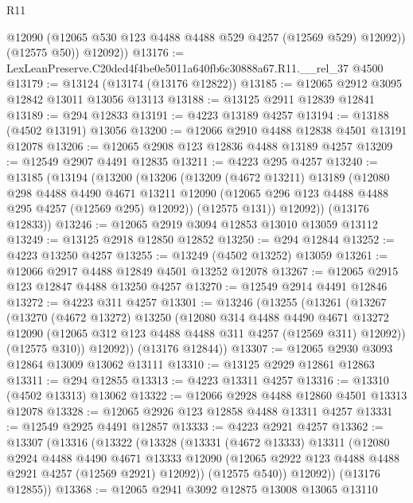 \begin{lexlean}{R11}
\begin{coremodule}
            @12090
            (@12065 @530 @123 @4488 @4488 @529 @4257 (@12569 @529) @12092))
          (@12575 @50))
        @12092))
@13176 := LexLeanPreserve.C20ded4f4be0e5011a640fb6c30888a67.R11.__rel_37 @4500
@13179 := @13124 (@13174 (@13176 @12822))
@13185 := @12065 @2912 @3095 @12842 @13011 @13056 @13113
@13188 := @13125 @2911 @12839 @12841
@13189 := @294 @12833
@13191 := @4223 @13189 @4257
@13194 := @13188 (@4502 @13191) @13056
@13200 := @12066 @2910 @4488 @12838 @4501 @13191 @12078
@13206 := @12065 @2908 @123 @12836 @4488 @13189 @4257
@13209 := @12549 @2907 @4491 @12835
@13211 := @4223 @295 @4257
@13240 := @13185
    (@13194
      (@13200
        (@13206
          (@13209
            (@4672 @13211)
            @13189
            (@12080
              @298
              @4488
              @4490
              @4671
              @13211
              @12090
              (@12065 @296 @123 @4488 @4488 @295 @4257 (@12569 @295) @12092))
            (@12575 @131))
          @12092))
      (@13176 @12833))
@13246 := @12065 @2919 @3094 @12853 @13010 @13059 @13112
@13249 := @13125 @2918 @12850 @12852
@13250 := @294 @12844
@13252 := @4223 @13250 @4257
@13255 := @13249 (@4502 @13252) @13059
@13261 := @12066 @2917 @4488 @12849 @4501 @13252 @12078
@13267 := @12065 @2915 @123 @12847 @4488 @13250 @4257
@13270 := @12549 @2914 @4491 @12846
@13272 := @4223 @311 @4257
@13301 := @13246
    (@13255
      (@13261
        (@13267
          (@13270
            (@4672 @13272)
            @13250
            (@12080
              @314
              @4488
              @4490
              @4671
              @13272
              @12090
              (@12065 @312 @123 @4488 @4488 @311 @4257 (@12569 @311) @12092))
            (@12575 @310))
          @12092))
      (@13176 @12844))
@13307 := @12065 @2930 @3093 @12864 @13009 @13062 @13111
@13310 := @13125 @2929 @12861 @12863
@13311 := @294 @12855
@13313 := @4223 @13311 @4257
@13316 := @13310 (@4502 @13313) @13062
@13322 := @12066 @2928 @4488 @12860 @4501 @13313 @12078
@13328 := @12065 @2926 @123 @12858 @4488 @13311 @4257
@13331 := @12549 @2925 @4491 @12857
@13333 := @4223 @2921 @4257
@13362 := @13307
    (@13316
      (@13322
        (@13328
          (@13331
            (@4672 @13333)
            @13311
            (@12080
              @2924
              @4488
              @4490
              @4671
              @13333
              @12090
              (@12065 @2922 @123 @4488 @4488 @2921 @4257 (@12569 @2921) @12092))
            (@12575 @540))
          @12092))
      (@13176 @12855))
@13368 := @12065 @2941 @3092 @12875 @13008 @13065 @13110

\end{coremodule}
\end{lexlean}
